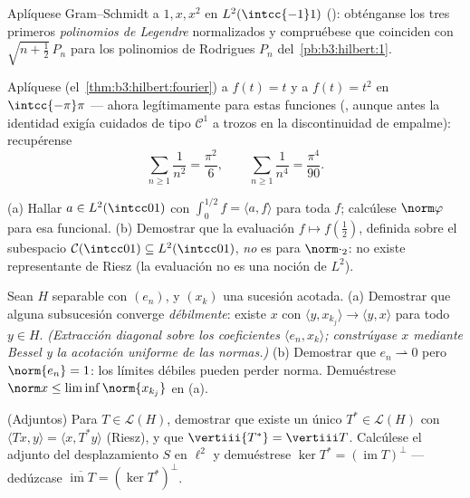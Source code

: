 \begin{exercise}[$\star\star$]\label{exo:b3:hilbert:4}
Aplíquese Gram--Schmidt a $1, x, x^2$ en $L^2(\intcc{-1}1)$
(): obténganse
los tres primeros \emph{polinomios de Legendre} normalizados y
compruébese que coinciden con $\sqrt{n + \frac12}\,P_n$ para los
polinomios de Rodrigues $P_n$ del~\cref{pb:b3:hilbert:1}.
\end{exercise}

\begin{exercise}[$\star\star$]\label{exo:b3:hilbert:5}
Aplíquese 
(el~\cref{thm:b3:hilbert:fourier}) a $f(t) = t$ y a $f(t) = t^2$ en
$\intcc{-\pi}\pi$ --- ahora legítimamente para estas funciones
(, aunque antes la
identidad exigía cuidados de tipo $\mathcal C^1$ a trozos en la
discontinuidad de empalme): recupérense
\[
\sum_{n\geq1}\frac1{n^2} = \frac{\pi^2}6,
\qquad
\sum_{n\geq1}\frac1{n^4} = \frac{\pi^4}{90} .
\]
\end{exercise}

\begin{exercise}[$\star\star$]\label{exo:b3:hilbert:6}
(a) Hallar $a \in L^2(\intcc01)$ con $\int_0^{1/2}f =
\langle a, f\rangle$ para toda $f$; calcúlese $\norm\varphi$ para esa
funcional. (b) Demostrar que la evaluación $f \mapsto f(\frac12)$,
definida sobre el subespacio $\mathcal C(\intcc01) \subseteq
L^2(\intcc01)$, \emph{no} es
 para $\norm\cdot_2$: no
existe representante de Riesz (la evaluación no es una noción de $L^2$).
\end{exercise}

\begin{exercise}[$\star\star\star$]\label{exo:b3:hilbert:7}
Sean $H$ separable con 
$(e_n)$, y $(x_k)$ una sucesión acotada. (a) Demostrar que alguna
subsucesión converge \emph{débilmente}: existe $x$ con
$\langle y, x_{k_j}\rangle \to \langle y,
x\rangle$ para todo $y \in H$. \emph{(Extracción diagonal sobre los
coeficientes $\langle e_n, x_k\rangle$; constrúyase $x$ mediante Bessel
y la acotación uniforme de las normas.)} (b) Demostrar que
$e_n \rightharpoonup 0$ pero $\norm{e_n} = 1$: los límites débiles
pueden perder norma. Demuéstrese $\norm x \leq
\liminf\norm{x_{k_j}}$ en (a).
\end{exercise}

\begin{exercise}[$\star\star$]\label{exo:b3:hilbert:8}
(Adjuntos) Para $T \in \mathcal L(H)$, demostrar que existe un único
$T^* \in \mathcal L(H)$ con $\langle Tx, y\rangle = \langle
x, T^*y\rangle$ (Riesz), y que $\vertiii{T^*} = \vertiii T$. Calcúlese
el adjunto del desplazamiento $S$ en $\ell^2$ y demuéstrese
$\ker T^* = (\operatorname{im}T)^\perp$ --- dedúzcase
$\overline{\operatorname{im}T} = (\ker T^*)^\perp$.
\end{exercise}

